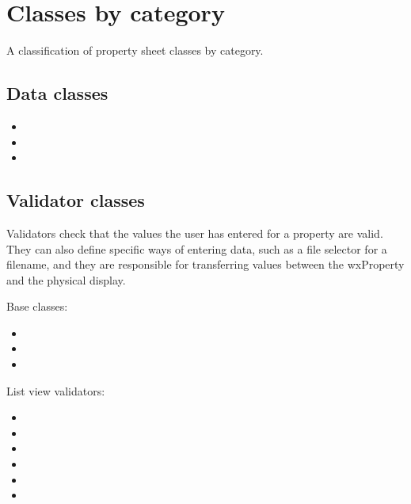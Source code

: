 \section{Classes by category}\label{proplistclassesbycat}

A classification of property sheet classes by category.

\subsection{Data classes}

\begin{itemize}\itemsep=0pt
\item {}
\item {}
\item {}
\end{itemize}

\subsection{Validator classes}\label{proplistvalidatorclasses}

Validators check that the values the user has entered for a property are
valid. They can also define specific ways of entering data, such as a
file selector for a filename, and they are responsible for transferring
values between the wxProperty and the physical display. 

Base classes:

\begin{itemize}\itemsep=0pt
\item {}
\item {}
\item {}
\end{itemize}

List view validators:

\begin{itemize}\itemsep=0pt
\item {}
\item {}
\item {}
\item {}
\item {}
\item {}
\end{itemize}


